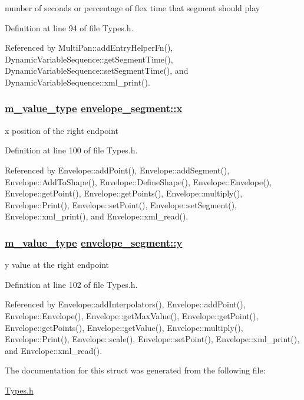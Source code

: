 number of seconds or percentage of flex time that segment should play 



Definition at line 94 of file Types.h.

Referenced by Multi\-Pan::add\-Entry\-Helper\-Fn(), Dynamic\-Variable\-Sequence::get\-Segment\-Time(), Dynamic\-Variable\-Sequence::set\-Segment\-Time(), and Dynamic\-Variable\-Sequence::xml\_\-print().\hypertarget{structenvelope__segment_o5}{
\subsubsection[x]{\setlength{\rightskip}{0pt plus 5cm}\hyperlink{Types_8h_a3}{m\_\-value\_\-type} \hyperlink{structenvelope__segment_o5}{envelope\_\-segment::x}}}
\label{structenvelope__segment_o5}


x position of the right endpoint 



Definition at line 100 of file Types.h.

Referenced by Envelope::add\-Point(), Envelope::add\-Segment(), Envelope::Add\-To\-Shape(), Envelope::Define\-Shape(), Envelope::Envelope(), Envelope::get\-Point(), Envelope::get\-Points(), Envelope::multiply(), Envelope::Print(), Envelope::set\-Point(), Envelope::set\-Segment(), Envelope::xml\_\-print(), and Envelope::xml\_\-read().\hypertarget{structenvelope__segment_o6}{
\subsubsection[y]{\setlength{\rightskip}{0pt plus 5cm}\hyperlink{Types_8h_a3}{m\_\-value\_\-type} \hyperlink{structenvelope__segment_o6}{envelope\_\-segment::y}}}
\label{structenvelope__segment_o6}


y value at the right endpoint 



Definition at line 102 of file Types.h.

Referenced by Envelope::add\-Interpolators(), Envelope::add\-Point(), Envelope::Envelope(), Envelope::get\-Max\-Value(), Envelope::get\-Point(), Envelope::get\-Points(), Envelope::get\-Value(), Envelope::multiply(), Envelope::Print(), Envelope::scale(), Envelope::set\-Point(), Envelope::xml\_\-print(), and Envelope::xml\_\-read().

The documentation for this struct was generated from the following file:\begin{CompactItemize}
\item 
\hyperlink{Types_8h}{Types.h}\end{CompactItemize}
